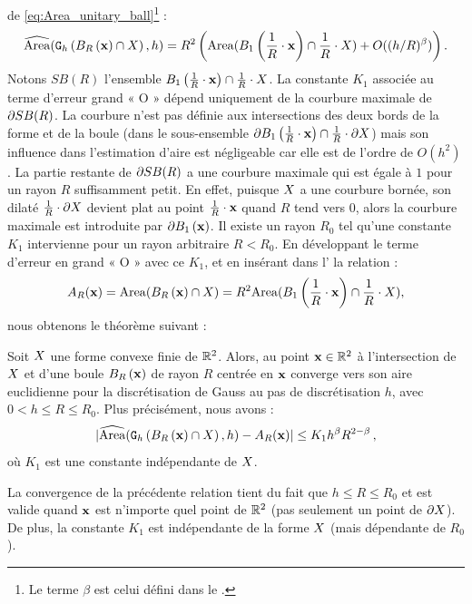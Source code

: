 de \ref{eq:Area_unitary_ball}\footnote{Le terme $\beta$ est celui défini dans le .} :
\begin{equation}
  \label{eq:Area_unitary_ball_shape}
  \AreaC(\DigF{\Ball{R}{\vx} \cap \Shape}{h}, h) = R^2 \left(\Area( \Ball{1}{\frac{1}{R} \cdot \vx} \cap \frac{1}{R} \cdot \Shape) + O( (h/R)^\beta) \right).
\end{equation}
%
Notons $SB(R)$ l'ensemble $\Ball{1}{\frac{1}{R} \cdot \vx} \cap \frac{1}{R}
\cdot \Shape$. La constante $K_1$ associée au terme d'erreur grand « O » dépend
uniquement de la courbure maximale de $\BT SB(R)$. La courbure n'est pas définie
aux intersections des deux bords de la forme et de la boule (dans le
sous-ensemble $\BT \Ball{1}{\frac{1}{R} \cdot \vx} \cap \frac{1}{R} \cdot \dS$)
mais son influence dans l'estimation d'aire est négligeable car elle est de l'ordre
de $O(h^2)$. La partie restante de $\BT SB(R)$ a une courbure maximale qui est
égale à $1$ pour un rayon $R$ suffisamment petit. En effet, puisque $\Shape$ a
une courbure bornée, son dilaté $\frac{1}{R} \cdot \dS$ devient plat au point
$\frac{1}{R} \cdot \vx$ quand $R$ tend vers $0$, alors la courbure maximale est
introduite par $\BT \Ball{1}{\vx}$. Il existe un rayon $R_0$ tel qu'une
constante $K_1$ intervienne pour un rayon arbitraire $R < R_0$. En développant
le terme d'erreur en grand « O » avec ce $K_1$, et en insérant dans
l' la relation :
%
\begin{equation}
  A_R(\vx) = \Area( \Ball{R}{\vx} \cap \Shape ) = R^2 \Area( \Ball{1}{\frac{1}{R} \cdot \vx} \cap \frac{1}{R} \cdot \Shape),
\end{equation}
%
nous obtenons le théorème suivant :
%
\begin{theorem}{}
  \label{thm:convergence-area-intersection}
  Soit $\Shape$ une forme convexe finie de $\R^2$. Alors,  au point $\vx \in \R^2$ à l'intersection de $\Shape$ et
  d'une boule $\Ball{R}{\vx}$ de rayon $R$ centrée en $\vx$ converge vers son
  aire euclidienne pour la discrétisation de Gauss au pas de discrétisation $h$,
  avec $0 < h \le R \le R_0$. Plus précisément, nous avons :
  \begin{equation}\label{eq:convergence-area-intersection}
    | \AreaC(\DigF{\Ball{R}{\vx} \cap \Shape}{h}, h) - A_R(\vx) | \le K_1 h^\beta R^{2-\beta} \,,
  \end{equation}
  où $K_1$ est une constante indépendante de $\Shape$.
\end{theorem}
%
La convergence de la précédente relation tient du fait que $h \le R \le R_0$ et
est valide quand $\vx$ est n'importe quel point de $\R^2$ (pas seulement un
point de $\dS$). De plus, la constante $K_1$ est indépendante de la forme
$\Shape$ (mais dépendante de $R_0$).

